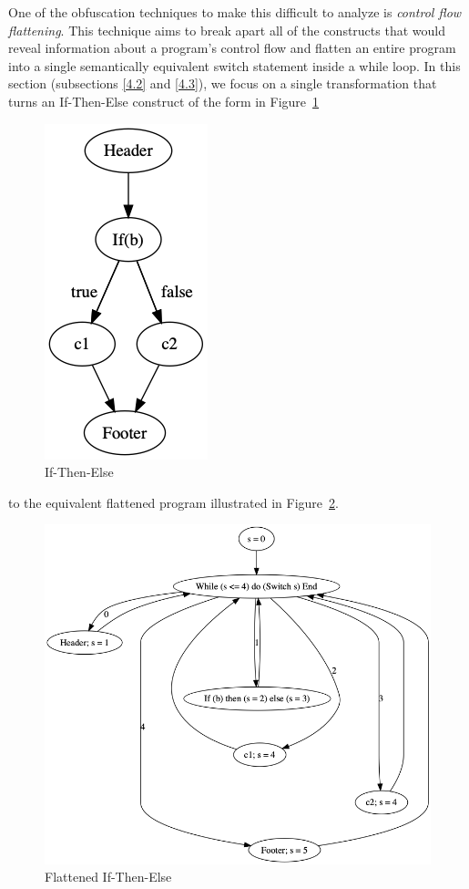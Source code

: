 \documentclass[compsoc,conference,a4paper,10pt,times]{IEEEtran}
\begin{document}

One of the obfuscation techniques to make this difficult to analyze is \emph{control flow flattening}. This technique aims to break apart all of the constructs that would reveal information about a program's control flow and flatten an entire program into a single semantically equivalent switch statement inside a while loop.  
In this section (subsections \ref{4.2} and \ref{4.3}), we focus on a single transformation that turns an If-Then-Else construct of the form in Figure~\ref{fig:ifElse}
%
\begin{figure}[hbt]
\centering
\includegraphics[scale=0.27]{ifElse}
\caption{If-Then-Else}
 \label{fig:ifElse}
\end{figure}
to the equivalent flattened program illustrated in Figure~\ref{fig:flatIfElse}.
\begin{figure}[hbt]
\centering
\includegraphics[scale=0.27]{ifElseFlat}
\caption{Flattened If-Then-Else}
 \label{fig:flatIfElse}
\end{figure}
%
\end{document}
